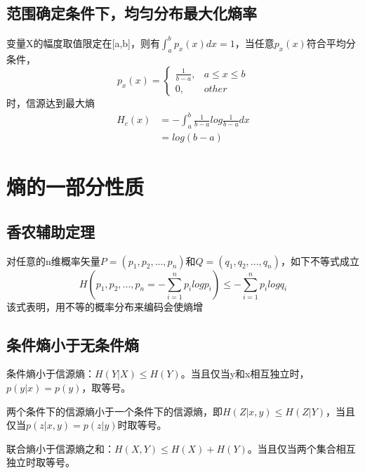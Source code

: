 \documentclass[a4paper, 12pt]{article}
\begin{document}
    \subsection{范围确定条件下，均匀分布最大化熵率}
    变量X的幅度取值限定在[a,b]，则有$\int_{a}^{b}p_x(x)dx=1$，当任意$p_x(x)$符合平均分条件，
    \[
        p_x(x)=
            \begin{cases}
                \frac{1}{b-a},&a\le x \le b\\
                0, &other
            \end{cases}
        \]
    时，信源达到最大熵
    \begin{equation}
        \begin{aligned}
            H_c(x)&=-\int_{a}^{b}\frac{1}{b-a}log\frac{1}{b-a}dx\\
            &=log(b-a)
        \end{aligned}
    \end{equation}
    \section{熵的一部分性质}
    \subsection{香农辅助定理}
    对任意的n维概率矢量$P=(p_1,p_2,...,p_n)$和$Q=(q_1,q_2,...,q_n)$，如下不等式成立
    \[
        H(p_1,p_2,...,p_n = -\sum_{i=1}^{n}p_ilogp_i)\le -\sum_{i=1}^{n}p_ilogq_i    
    \]
    该式表明，用不等的概率分布来编码会使熵增
    \subsection{条件熵小于无条件熵}
    条件熵小于信源熵：$H(Y|X)\le H(Y)$。当且仅当y和x相互独立时，$p(y|x)=p(y)$，取等号。

    两个条件下的信源熵小于一个条件下的信源熵，即$H(Z|x,y)\le H(Z|Y)$，当且仅当$p(z|x,y)=p(z|y)$时取等号。

    联合熵小于信源熵之和：$H(X,Y)\le H(X) + H(Y)$。当且仅当两个集合相互独立时取等号。
\end{document}
